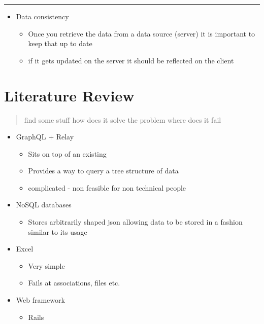 \documentclass[
  12pt,
]{article}
\providecommand{\tightlist}{%
  \setlength{\itemsep}{0pt}\setlength{\parskip}{0pt}}
\begin{document}
\begin{center}\rule{0.5\linewidth}{\linethickness}\end{center}

\begin{itemize}
\tightlist
\item
  Data consistency

  \begin{itemize}
  \tightlist
  \item
    Once you retrieve the data from a data source (server) it is
    important to keep that up to date
  \item
    if it gets updated on the server it should be reflected on the
    client
  \end{itemize}
\end{itemize}

\hypertarget{literature-review}{%
\section{Literature Review}\label{literature-review}}

\begin{quote}
find some stuff how does it solve the problem where does it fail
\end{quote}

\begin{itemize}
\item
  GraphQL + Relay

  \begin{itemize}
  \tightlist
  \item
    Sits on top of an existing
  \item
    Provides a way to query a tree structure of data
  \item
    complicated - non feasible for non technical people
  \end{itemize}
\item
  NoSQL databases

  \begin{itemize}
  \tightlist
  \item
    Stores arbitrarily shaped json allowing data to be stored in a
    fashion similar to its usage
  \end{itemize}
\item
  Excel

  \begin{itemize}
  \tightlist
  \item
    Very simple
  \item
    Fails at associations, files etc.
  \end{itemize}
\item
  Web framework

  \begin{itemize}
  \tightlist
  \item
    Rails
  \end{itemize}
\end{itemize}
\end{document}
